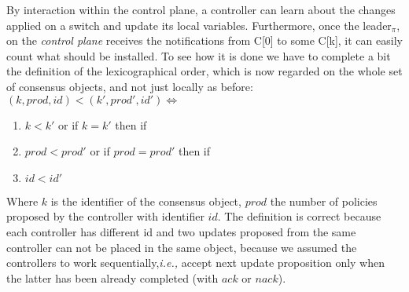 \documentclass{article}
\theoremstyle{remark}
\begin{document}
 By interaction within the control plane, a controller can learn about the changes applied on a switch and update its local variables. Furthermore, once the leader$_\pi$, on the \emph{control plane} receives the notifications from C[0] to some C[k], it can easily count what should be installed.%
To see how it is done we have to complete a bit the definition of the lexicographical order, which is now regarded on the whole set of consensus objects, and not just locally as before:
$(k,prod,id)<(k',prod',id') \Leftrightarrow $
\begin{enumerate}
\item $k<k'$ or if $k=k'$ then if
\item $prod<prod'$ or if $prod=prod'$ then if
\item $id<id'$
\end{enumerate}
Where $k$ is the identifier of the consensus object, $prod$ the number of policies proposed by the controller with identifier $id$. The definition is correct because each controller has different id and two updates proposed from the same controller can not be placed in the same object, because we assumed the controllers to work sequentially,\emph{i.e.,} accept next update proposition only when the latter has been already completed (with $ack$ or $nack$).
%
\end{document}

